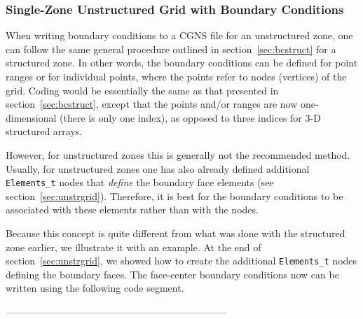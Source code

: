 \documentclass[12pt]{article}
\begin{document}
\subsubsection{Single-Zone Unstructured Grid with Boundary Conditions} \label{sec:bcunstr}

When writing boundary conditions to a CGNS file for an unstructured
zone, one can follow the same general procedure outlined in
section~\ref{sec:bcstruct} for a structured zone.
In other words, the boundary conditions can be defined for point ranges or
for individual points, where the points refer to nodes (vertices) of the
grid.
Coding would be essentially the same as that presented in
section~\ref{sec:bcstruct}, except that the points and/or ranges are now
one-dimensional (there is only one index), as opposed to three indices
for 3-D structured arrays.

However, for unstructured zones this is generally not the recommended method.
Usually, for unstructured zones one has also already defined
additional {\tt Elements\_t} nodes that {\it define} the boundary face elements
(see section~\ref{sec:unstrgrid}).
Therefore, it is best for the boundary conditions to be associated with
these elements rather than with the nodes.

Because this concept is quite different from what was done with the
structured zone earlier, we illustrate it with an example.  At the end
of section~\ref{sec:unstrgrid}, we showed how to create the additional
{\tt Elements\_t} nodes defining the boundary faces.  The face-center
boundary conditions now can be written using the following code segment.

--------------------------------------------------------------------
\end{document}
